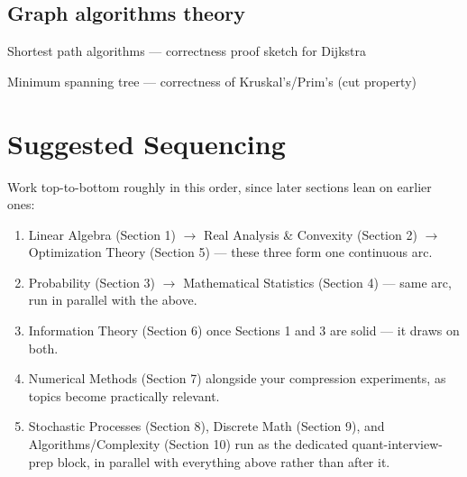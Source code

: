\subsection{Graph algorithms theory}
\begin{tasklist}
    \item Shortest path algorithms — correctness proof sketch for Dijkstra
    \item Minimum spanning tree — correctness of Kruskal's/Prim's (cut property)
\end{tasklist}

\section*{Suggested Sequencing}

Work top-to-bottom roughly in this order, since later sections lean on earlier ones:

\begin{enumerate}[leftmargin=1.6em]
    \item Linear Algebra (Section 1) $\to$ Real Analysis \& Convexity (Section 2) $\to$ Optimization Theory (Section 5) — these three form one continuous arc.
    \item Probability (Section 3) $\to$ Mathematical Statistics (Section 4) — same arc, run in parallel with the above.
    \item Information Theory (Section 6) once Sections 1 and 3 are solid — it draws on both.
    \item Numerical Methods (Section 7) alongside your compression experiments, as topics become practically relevant.
    \item Stochastic Processes (Section 8), Discrete Math (Section 9), and Algorithms/Complexity (Section 10) run as the dedicated quant-interview-prep block, in parallel with everything above rather than after it.
\end{enumerate}

